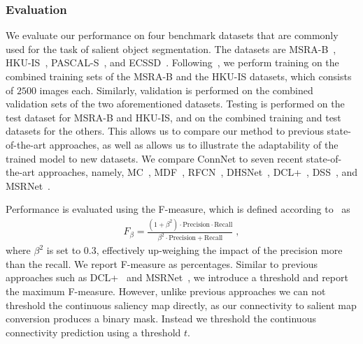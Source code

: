 \documentclass[journal]{IEEEtran}
\begin{document}
\subsubsection{Evaluation}
\label{sec:eval}
We evaluate our performance on four benchmark datasets that are commonly used for the task of salient object segmentation. The datasets are MSRA-B~\cite{liu2011learning}, HKU-IS~\cite{li2015visual}, PASCAL-S~\cite{li2014secrets}, and ECSSD~\cite{yan2013hierarchical}. 
Following~\cite{li2015visual,li2016deep,li2017instance}, we perform training on the combined training sets of the MSRA-B and the HKU-IS datasets, which consists of $2500$ images each. Similarly, validation is performed on the combined validation sets of the two aforementioned datasets. Testing is performed on the test dataset for MSRA-B and HKU-IS, and on the combined training and test datasets for the others.
This allows us to compare our method to previous state-of-the-art approaches, as well as allows us to illustrate the adaptability of the trained model to new datasets.
We compare ConnNet to seven recent state-of-the-art approaches, namely, MC~\cite{zhao2015saliency}, MDF~\cite{li2015visual}, RFCN~\cite{wang2016saliency}, DHSNet~\cite{liu2016dhsnet}, DCL+~\cite{li2016deep}, DSS~\cite{hou2018deeply}, and MSRNet~\cite{li2017instance}.

Performance is evaluated using the F-measure, which is defined according to~\cite{li2016deep} as
\begin{align}
    F_\beta = \frac{(1+\beta^2)\cdot \text{Precision}\cdot\text{Recall}}{\beta^2\cdot \text{Precision} + \text{Recall}} \; ,
\end{align}
where $\beta^2$ is set to $0.3$, effectively up-weighing the impact of the precision more than the recall. We report F-measure as percentages. Similar to previous approaches such as DCL+~\cite{li2016deep} and MSRNet~\cite{li2017instance}, we introduce a threshold and report the maximum F-measure. However, unlike previous approaches we can not threshold the continuous saliency map directly, as our connectivity to salient map conversion produces a binary mask. Instead we threshold the continuous connectivity prediction using a threshold $t$.
\end{document}
